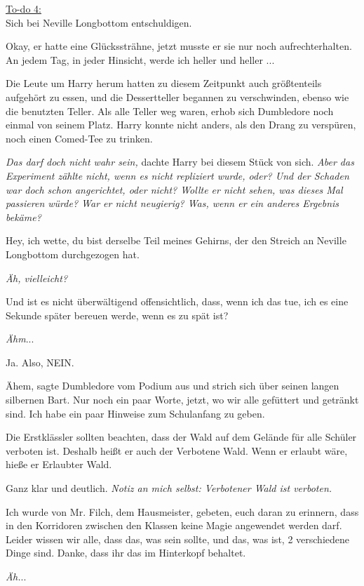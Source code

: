\underline{To-do 4:}\\
Sich bei Neville Longbottom entschuldigen.

Okay, er hatte eine Glückssträhne, jetzt musste er sie nur noch
aufrechterhalten. An jedem Tag, in jeder Hinsicht, werde ich heller und
heller ...

Die Leute um Harry herum hatten zu diesem Zeitpunkt auch größtenteils aufgehört
zu essen, und die Dessertteller begannen zu verschwinden, ebenso wie die
benutzten Teller. Als alle Teller weg waren, erhob sich Dumbledore noch einmal
von seinem Platz. Harry konnte nicht anders, als den Drang zu verspüren, noch
einen Comed-Tee zu trinken.

\emph{Das darf doch nicht wahr sein,} dachte Harry bei diesem Stück von sich.
\emph{Aber das Experiment zählte nicht, wenn es nicht repliziert wurde, oder?
Und der Schaden war doch schon angerichtet, oder nicht? Wollte er nicht sehen,
was dieses Mal passieren würde? War er nicht neugierig? Was, wenn er ein anderes
Ergebnis bekäme?}

Hey, ich wette, du bist derselbe Teil meines Gehirns, der den Streich an Neville
Longbottom durchgezogen hat.

\emph{Äh, vielleicht?}

Und ist es nicht überwältigend offensichtlich, dass, wenn ich das tue, ich es
eine Sekunde später bereuen werde, wenn es zu spät ist?

\emph{Ähm}...

Ja. Also, NEIN.

\glqq{}Ähem\grqq{}, sagte Dumbledore vom Podium aus und strich sich über seinen
langen silbernen Bart. \glqq{}Nur noch ein paar Worte, jetzt, wo wir alle
gefüttert und getränkt sind. Ich habe ein paar Hinweise zum Schulanfang zu
geben.\grqq{}

\glqq{}Die Erstklässler sollten beachten, dass der Wald auf dem Gelände für alle
Schüler verboten ist. Deshalb heißt er auch der Verbotene Wald. Wenn er erlaubt
wäre, hieße er Erlaubter Wald.\grqq{}

Ganz klar und deutlich.
\emph{Notiz an mich selbst: Verbotener Wald ist verboten.}

\glqq{}Ich wurde von Mr. Filch, dem Hausmeister, gebeten, euch daran zu
erinnern, dass in den Korridoren zwischen den Klassen keine Magie angewendet
werden darf. Leider wissen wir alle, dass das, was sein sollte, und das, was
ist, 2 verschiedene Dinge sind. Danke, dass ihr das im Hinterkopf
behaltet.\grqq{}

\emph{Äh.}..

